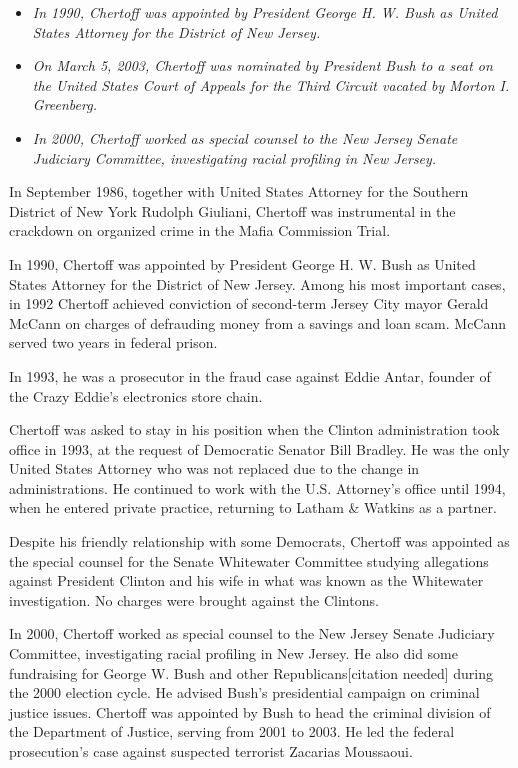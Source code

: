 \begin{itemize}
\item
  \emph{In 1990, Chertoff was appointed by President George H. W. Bush
  as United States Attorney for the District of New Jersey.}
\item
  \emph{On March 5, 2003, Chertoff was nominated by President Bush to a
  seat on the United States Court of Appeals for the Third Circuit
  vacated by Morton I. Greenberg.}
\item
  \emph{In 2000, Chertoff worked as special counsel to the New Jersey
  Senate Judiciary Committee, investigating racial profiling in New
  Jersey.}
\end{itemize}

In September 1986, together with United States Attorney for the Southern
District of New York Rudolph Giuliani, Chertoff was instrumental in the
crackdown on organized crime in the Mafia Commission Trial.

In 1990, Chertoff was appointed by President George H. W. Bush as United
States Attorney for the District of New Jersey. Among his most important
cases, in 1992 Chertoff achieved conviction of second-term Jersey City
mayor Gerald McCann on charges of defrauding money from a savings and
loan scam. McCann served two years in federal prison.

In 1993, he was a prosecutor in the fraud case against Eddie Antar,
founder of the Crazy Eddie's electronics store chain.

Chertoff was asked to stay in his position when the Clinton
administration took office in 1993, at the request of Democratic Senator
Bill Bradley. He was the only United States Attorney who was not
replaced due to the change in administrations. He continued to work with
the U.S. Attorney's office until 1994, when he entered private practice,
returning to Latham \& Watkins as a partner.

Despite his friendly relationship with some Democrats, Chertoff was
appointed as the special counsel for the Senate Whitewater Committee
studying allegations against President Clinton and his wife in what was
known as the Whitewater investigation. No charges were brought against
the Clintons.

In 2000, Chertoff worked as special counsel to the New Jersey Senate
Judiciary Committee, investigating racial profiling in New Jersey. He
also did some fundraising for George W. Bush and other
Republicans{[}citation needed{]} during the 2000 election cycle. He
advised Bush's presidential campaign on criminal justice issues.
Chertoff was appointed by Bush to head the criminal division of the
Department of Justice, serving from 2001 to 2003. He led the federal
prosecution's case against suspected terrorist Zacarias Moussaoui.

